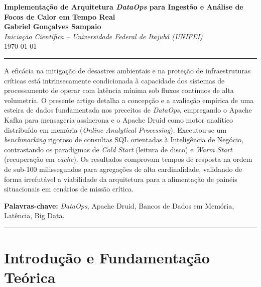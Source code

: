 \documentclass[12pt, a4paper]{article}
\begin{document}
\begin{center}
    \Large\textbf{Implementação de Arquitetura \textit{DataOps} para Ingestão e Análise de Focos de Calor em Tempo Real} \\[0.5cm]
    \normalsize\textbf{Gabriel Gonçalves Sampaio} \\
    \small\textit{Iniciação Científica -- Universidade Federal de Itajubá (UNIFEI)} \\[0.2cm]
    \small{\today}
\end{center}

\vspace{0.5cm}

\noindent\rule{\textwidth}{1pt}
\begin{Resumo}
\noindent A eficácia na mitigação de desastres ambientais e na proteção de infraestruturas críticas está intrinsecamente condicionada à capacidade dos sistemas de processamento de operar com latência mínima sob fluxos contínuos de alta volumetria. O presente artigo detalha a concepção e a avaliação empírica de uma esteira de dados fundamentada nos preceitos de \textit{DataOps}, empregando o Apache Kafka para mensageria assíncrona e o Apache Druid como motor analítico distribuído em memória (\textit{Online Analytical Processing}). Executou-se um \textit{benchmarking} rigoroso de consultas SQL orientadas à Inteligência de Negócio, contrastando os paradigmas de \textit{Cold Start} (leitura de disco) e \textit{Warm Start} (recuperação em \textit{cache}). Os resultados comprovam tempos de resposta na ordem de sub-100 milissegundos para agregações de alta cardinalidade, validando de forma irrefutável a viabilidade da arquitetura para a alimentação de painéis situacionais em cenários de missão crítica.
\end{Resumo}
\vspace{0.2cm}
\noindent\textbf{Palavras-chave:} \textit{DataOps}, Apache Druid, Bancos de Dados em Memória, Latência, Big Data.
\vspace{0.1cm}
\noindent\rule{\textwidth}{1pt}

\newpage

\section{Introdução e Fundamentação Teórica}
\end{document}

